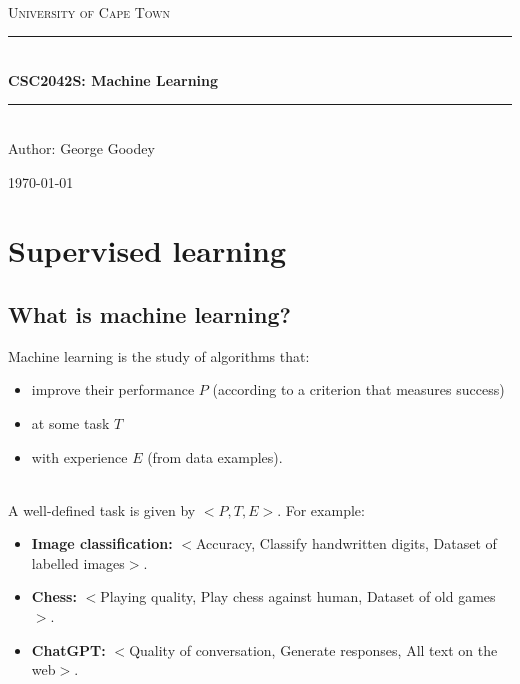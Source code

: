 \documentclass[11pt]{article}
\begin{document}
\begin{titlepage}
    \centering
    
    $\quad$\\[6cm]

    \textsc{\LARGE University of Cape Town}\\[1.5cm]
    
    \rule{\linewidth}{0.5mm} \\[0.4cm]
    { \huge \bfseries CSC2042S: Machine Learning \\[0.4cm] }
    \rule{\linewidth}{0.5mm} \\[1.5cm]
    
    { \Large Author: George Goodey }
    
    \vfill

    {\large \today}
    
\end{titlepage}

\tableofcontents
\newpage

\section{Supervised learning}

\subsection{What is machine learning?}
\begin{definition}
Machine learning is the study of algorithms that:
\begin{itemize}
    \item improve their performance $P$ (according to a criterion that measures success)
    \item at some task $T$
    \item with experience $E$ (from data examples).
\end{itemize}
\end{definition}
$\quad$\\[0em]
A well-defined task is given by $<P,T,E>$. For example:
\begin{itemize}
    \item \textbf{Image classification:} $<$Accuracy, Classify handwritten digits, Dataset of labelled images$>$.
    \item \textbf{Chess:} $<$Playing quality, Play chess against human, Dataset of old games$>$.
    \item \textbf{ChatGPT:} $<$Quality of conversation, Generate responses, All text on the web$>$.
\end{itemize}
\end{document}
